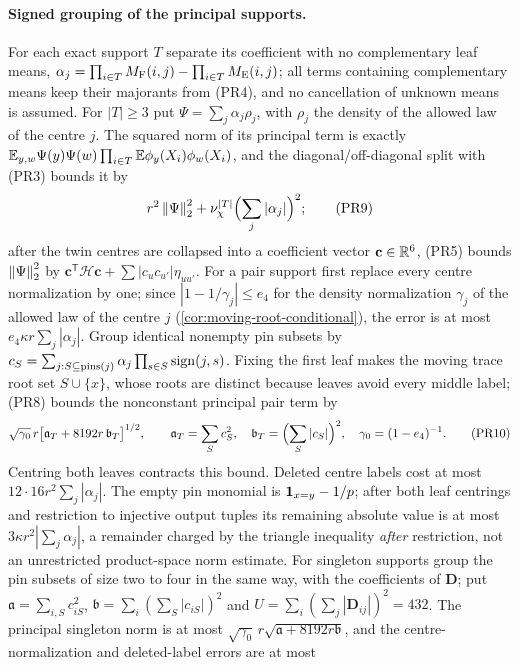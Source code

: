 \paragraph{Signed grouping of the principal supports.}
For each exact support $T$ separate its coefficient with no complementary leaf means,
$\alpha_j=\prod_{i\in T}M_{\rm F}(i,j)-\prod_{i\in T}M_{\rm E}(i,j)$; all terms containing
complementary means keep their majorants from (PR4), and no cancellation of unknown
means is assumed. For $|T|\ge3$ put $\Psi=\sum_j\alpha_j\rho_j$, with $\rho_j$ the
density of the allowed law of the centre $j$. The squared norm of its
principal term is exactly $\mathbb E_{y,w}\Psi(y)\Psi(w)\prod_{i\in T}\mathbb E\phi_y(X_i)\phi_w(X_i)$,
and the diagonal/off-diagonal split with (PR3) bounds it by
\[
 r^2\left\|\Psi\right\|_2^2+\nu_\chi^{|T|}\Bigl(\sum_j|\alpha_j|\Bigr)^2;\tag{PR9}
\]
after the twin centres are collapsed into a coefficient vector $\mathbf c\in\mathbb R^6$,
(PR5) bounds $\left\|\Psi\right\|_2^2$ by
$\mathbf c^{\mathsf T}\mathcal H\mathbf c+\sum|c_uc_{u'}|\eta_{uu'}$. For a pair support
first replace every centre normalization by one; since
$|1-1/\gamma_j|\le e_4$ for the density normalization
$\gamma_j$ of the allowed law of the centre $j$
(\cref{cor:moving-root-conditional}), the error is at most
$e_4\kappa r\sum_j|\alpha_j|$. Group identical nonempty pin subsets by
$c_S=\sum_{j:S\subseteq{\rm pins}(j)}\alpha_j\prod_{s\in S}{\rm sign}(j,s)$. Fixing the
first leaf makes the moving trace root set $S\cup\{x\}$, whose roots are distinct because
leaves avoid every middle label; (PR8) bounds the nonconstant principal pair term by
\[
 \sqrt{\gamma_0}\,r\bigl[\mathfrak a_T+8192r\,\mathfrak b_T\bigr]^{1/2},\qquad
 \mathfrak a_T=\sum_Sc_S^2,\quad\mathfrak b_T=\Bigl(\sum_S|c_S|\Bigr)^2,\quad
 \gamma_0=(1-e_4)^{-1}.\tag{PR10}
\]
Centring both leaves contracts this bound. Deleted centre labels cost at most
$12\cdot16r^2\sum_j|\alpha_j|$. The empty pin monomial is $\mathbf 1_{x=y}-1/p$; after both
leaf centrings and restriction to injective output tuples its remaining absolute value is
at most $3\kappa r^2|\sum_j\alpha_j|$, a remainder charged by the triangle inequality
\emph{after} restriction, not an unrestricted product-space norm estimate. For singleton
supports group the pin subsets of size two to four in the same way, with the
coefficients of $\mathbf D$; put $\mathfrak a=\sum_{i,S}c_{iS}^2$,
$\mathfrak b=\sum_i(\sum_S|c_{iS}|)^2$ and $U=\sum_i(\sum_j|\mathbf D_{ij}|)^2=432$. The
principal singleton norm is at most $\sqrt{\gamma_0}\,r\sqrt{\mathfrak a+8192r\mathfrak b}$,
and the centre-normalization and deleted-label errors are at most
